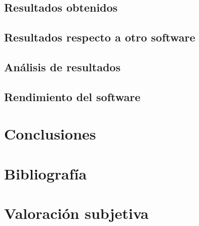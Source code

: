 \documentclass[11pt, titlepage,a4paper]{article}
\begin{document}
\subsection{Resultados obtenidos}

\subsection{Resultados respecto a otro software}

\subsection{Análisis de resultados}

\subsection{Rendimiento del software}

\section{Conclusiones}

\section{Bibliografía}



\section{Valoración subjetiva}
\end{document}
